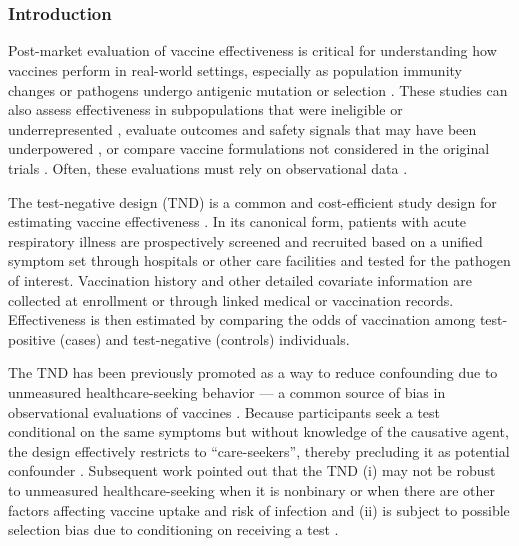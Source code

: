 \documentclass[11pt]{article}
\begin{document}
\pagebreak \newpage

\doparttoc %
\faketableofcontents %

\part{} %

\section*{Introduction} \label{sec:introduction}
Post-market evaluation of vaccine effectiveness is critical for understanding how vaccines perform in real-world settings, especially as population immunity changes or pathogens undergo antigenic mutation or selection \cite{patel_postlicensure_2020,hitchings_effectiveness_2021,israel_elapsed_2021}. These studies can also assess effectiveness in subpopulations that were ineligible or underrepresented \cite{olson_effectiveness_2022}, evaluate outcomes and safety signals that may have been underpowered \cite{thompson_effectiveness_2021}, or compare vaccine formulations not considered in the original trials \cite{skowronski_two-dose_2022}. Often, these evaluations must rely on observational data \cite{chua_use_2020-1,dean_covid-19_2021}. 

The test-negative design (TND) is a common and cost-efficient study design for estimating vaccine effectiveness \cite{sullivan_potential_2014,jackson_test-negative_2013}. In its canonical form, patients with acute respiratory illness are prospectively screened and recruited based on a unified symptom set through hospitals or other care facilities and tested for the pathogen of interest. Vaccination history and other detailed covariate information are collected at enrollment or through linked medical or vaccination records. Effectiveness is then estimated by comparing the odds of vaccination among test-positive (cases) and test-negative (controls) individuals.

The TND has been previously promoted as a way to reduce confounding due to unmeasured healthcare-seeking behavior  --- a common source of bias in observational evaluations of vaccines \cite{jackson_test-negative_2013}. Because participants seek a test conditional on the same symptoms but without knowledge of the causative agent, the design effectively restricts to ``care-seekers'', thereby precluding it as potential confounder \cite{jackson_test-negative_2013}. Subsequent work pointed out that the TND (i) may not be robust to unmeasured healthcare-seeking when it is nonbinary or when there are other factors affecting vaccine uptake and risk of infection \cite{sullivan_theoretical_2016,lewnard_theoretical_2021,lipsitch_observational_2016} and (ii) is subject to possible selection bias due to conditioning on receiving a test \cite{sullivan_theoretical_2016,lipsitch_observational_2016}.
\end{document}
